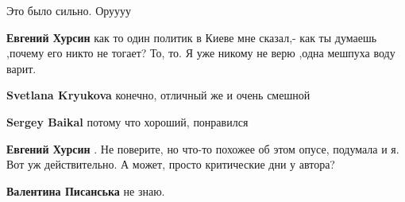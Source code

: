 \begin{itemize}
\begin{itemize}
 
Это было сильно. Оруууу

 
\textbf{Евгений Хурсин} как то один политик в Киеве мне сказал,- как ты думаешь ,почему его никто не тогает? То, то. Я уже никому не верю ,одна мешпуха воду варит.

 

\textbf{Svetlana Kryukova} конечно, отличный же и очень смешной

 

\textbf{Sergey Baikal} потому что хороший, понравился

 
\textbf{Евгений Хурсин} . Не поверите, но что-то похожее об этом опусе, подумала и я. Вот уж действительно. А может, просто критические дни у автора?

 

\textbf{Валентина Писанська} не знаю.

 

\end{itemize}
\end{itemize}
